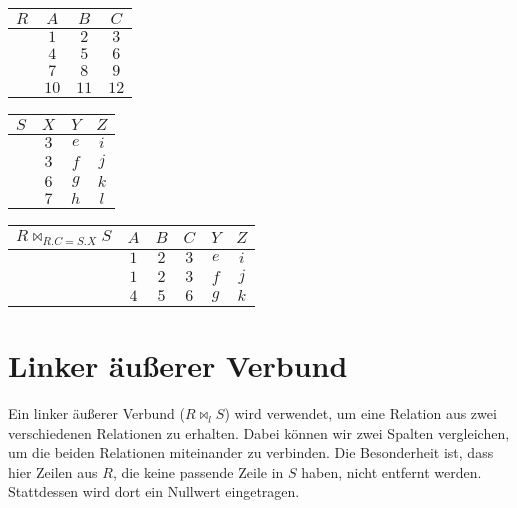 \documentclass[12pt,a4paper,notitlepage,leqno]{article}
\begin{document}
\begin{center}
    \begin{tabular}{c|ccc}
        $R$ & $A$ & $B$ & $C$ \\\hline
         & $1$ & $2$ & $3$ \\
         & $4$ & $5$ & $6$ \\
         & $7$ & $8$ & $9$ \\
         & $10$ & $11$ & $12$
    \end{tabular}
    \hspace{1cm}
    \begin{tabular}{c|ccc}
        $S$ & $X$ & $Y$ & $Z$ \\\hline
         & $3$ & $e$ & $i$ \\
         & $3$ & $f$ & $j$ \\
         & $6$ & $g$ & $k$ \\
         & $7$ & $h$ & $l$
    \end{tabular}
    \hspace{1cm}
    \begin{tabular}{c|ccccc}
        $R \bowtie_{R.C=S.X} S$ & $A$ & $B$ & $C$ & $Y$ & $Z$ \\\hline
         & $1$ & $2$ & $3$ & $e$ & $i$ \\
         & $1$ & $2$ & $3$ & $f$ & $j$ \\
         & $4$ & $5$ & $6$ & $g$ & $k$\\
    \end{tabular}
\end{center}

\section*{Linker äußerer Verbund}

Ein linker äußerer Verbund ($R \bowtie_l S$) wird verwendet, um eine Relation aus zwei verschiedenen Relationen zu erhalten. Dabei können wir zwei Spalten vergleichen, um die beiden Relationen miteinander zu verbinden. Die Besonderheit ist, dass hier Zeilen aus $R$, die keine passende Zeile in $S$ haben, nicht entfernt werden. Stattdessen wird dort ein Nullwert eingetragen. 
\end{document}
